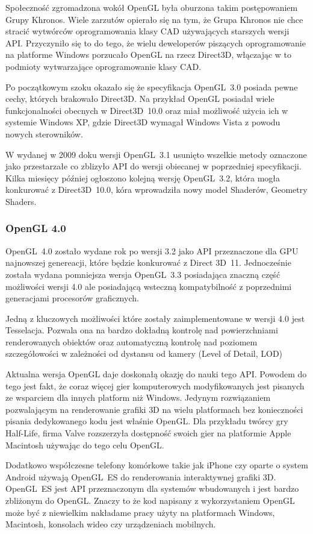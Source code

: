 Społeczność zgromadzona wokół OpenGL była oburzona takim postępowaniem Grupy Khronos. Wiele zarzutów opierało się na tym, że Grupa Khronos nie chce stracić wytwórców oprogramowania klasy CAD używających starszych wersji API. Przyczyniło się to do tego, że wielu deweloperów piszących oprogramowanie na platforme Windows porzucało OpenGL na rzecz Direct3D, włączając w to podmioty wytwarzające oprogramowanie klasy CAD.

Po początkowym szoku okazało się że specyfikacja OpenGL~3.0 posiada pewne cechy, których brakowało Direct3D. Na przykład OpenGL posiadał wiele funkcjonalności obecnych w Direct3D~10.0 oraz miał możliwość użycia ich w systemie Windows XP, gdzie Direct3D wymagał Windows Vista z powodu nowych sterowników.

W wydanej w 2009 doku wersji OpenGL~3.1 usunięto wszelkie metody oznaczone jako przestarzałe co zblizyło API do wersji obiecanej w poprzedniej specyfikacji. Kilka miesięcy później ogłoszono kolejną wersję OpenGL~3.2, która mogła konkurować z Direct3D~10.0, kóra wprowadziła nowy model Shaderów, Geometry Shaders.

\subsubsection{OpenGL 4.0}
\thispagestyle{empty}
\par\indent

OpenGL~4.0 zostało wydane rok po wersji 3.2 jako API przeznaczone dla GPU najnowszej genereacji, które będzie konkurować z Direct 3D~11. Jednocześnie została wydana pomniejsza wersja OpenGL~3.3 posiadająca znaczną część możliwości wersji 4.0 ale posiadającą wsteczną kompatybilność z poprzednimi generacjami procesorów graficznych.

Jedną z kluczowych możliwości które zostały zaimplementowane w wersji 4.0 jest Tesselacja. Pozwala ona na bardzo dokładną kontrolę nad powierzchniami renderowanych obiektów oraz automatyczną kontrolę nad poziomem szczegółowości w zależności od dystansu od kamery (Level of Detail, LOD)

Aktualna wersja OpenGL daje doskonałą okazję do nauki tego API. Powodem do tego jest fakt, że coraz więcej gier komputerowych modyfikowanych jest pisanych ze wsparciem dla innych platform niż Windows. Jedynym rozwiązaniem pozwalającym na renderowanie grafiki 3D na wielu platformach bez konieczności pisania dedykowanego kodu jest właśnie OpenGL. Dla przykładu twórcy gry Half-Life, firma Valve rozszerzyła dostępność swoich gier na platformie Apple Macintosh używając do tego celu OpenGL.

Dodatkowo współczesne telefony komórkowe takie jak iPhone czy oparte o system Android używają OpenGL~ES do renderowania interaktywnej grafiki 3D. OpenGL~ES jest API przeznaczonym dla systemów wbudowanych i jest bardzo zbliżonym do OpenGL. Znaczy to że kod napisany z wykorzystaniem OpenGL może być z niewielkim nakładame pracy użyty na platformach Windows, Macintosh, konsolach wideo czy urządzeniach mobilnych.

